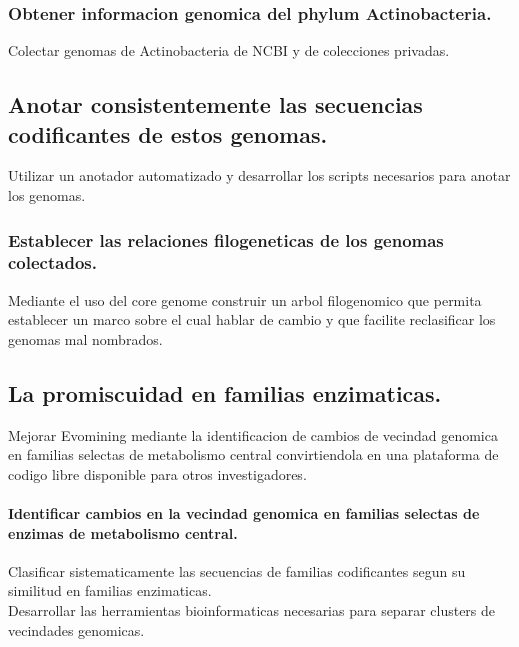 \documentclass[12pt,twoside]{reedthesis}
\begin{document}
  \subsubsection{Obtener informacion genomica del phylum
  Actinobacteria.}\label{obtener-informacion-genomica-del-phylum-actinobacteria.}
  
  Colectar genomas de Actinobacteria de NCBI y de colecciones privadas.
  
  \subsection{Anotar consistentemente las secuencias codificantes de estos
  genomas.}\label{anotar-consistentemente-las-secuencias-codificantes-de-estos-genomas.}
  
  Utilizar un anotador automatizado y desarrollar los scripts necesarios
  para anotar los genomas.
  
  \subsubsection{Establecer las relaciones filogeneticas de los genomas
  colectados.}\label{establecer-las-relaciones-filogeneticas-de-los-genomas-colectados.}
  
  Mediante el uso del core genome construir un arbol filogenomico que
  permita establecer un marco sobre el cual hablar de cambio y que
  facilite reclasificar los genomas mal nombrados.
  
  \subsection{La promiscuidad en familias
  enzimaticas.}\label{la-promiscuidad-en-familias-enzimaticas.}
  
  Mejorar Evomining mediante la identificacion de cambios de vecindad
  genomica en familias selectas de metabolismo central convirtiendola en
  una plataforma de codigo libre disponible para otros investigadores.
  
  \paragraph{Identificar cambios en la vecindad genomica en familias
  selectas de enzimas de metabolismo
  central.}\label{identificar-cambios-en-la-vecindad-genomica-en-familias-selectas-de-enzimas-de-metabolismo-central.}
  
  Clasificar sistematicamente las secuencias de familias codificantes
  segun su similitud en familias enzimaticas.\\
  Desarrollar las herramientas bioinformaticas necesarias para separar
  clusters de vecindades genomicas.
  
\end{document}
